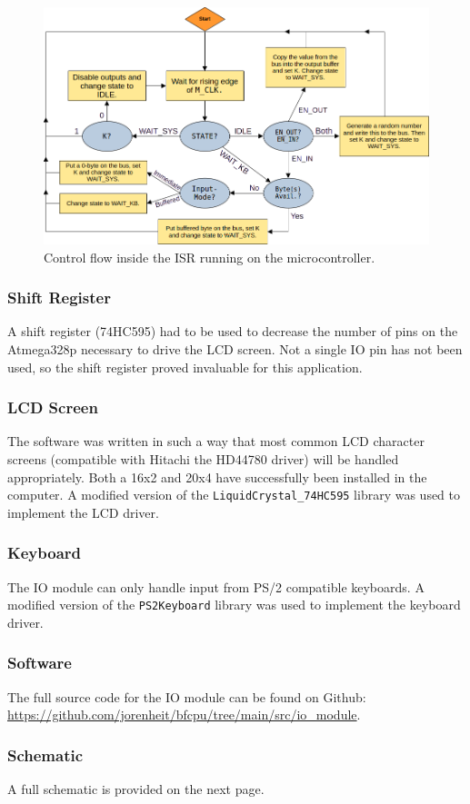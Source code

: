 \begin{figure}[H]
  \centering
  \includegraphics[width=\textwidth]{img/isrflow}
  \caption{Control flow inside the ISR running on the microcontroller.}
  \label{fig:isrflow}
\end{figure}

\subsubsection{Shift Register}
A shift register (74HC595) had to be used to decrease the number of pins on the Atmega328p necessary to drive the LCD screen. Not a single IO pin has not been used, so the shift register proved invaluable for this application.

\subsubsection{LCD Screen}
The software was written in such a way that most common LCD character screens (compatible with Hitachi the HD44780 driver) will be handled appropriately. Both a 16x2 and 20x4 have successfully been installed in the computer. A modified version of the \texttt{LiquidCrystal\_74HC595} library was used to implement the LCD driver.

\subsubsection{Keyboard}
The IO module can only handle input from PS/2 compatible keyboards. A modified version of the \texttt{PS2Keyboard} library was used to implement the keyboard driver.

\subsubsection{Software}
The full source code for the IO module can be found on Github: \url{https://github.com/jorenheit/bfcpu/tree/main/src/io_module}.

\subsubsection{Schematic}
A full schematic is provided on the next page.

